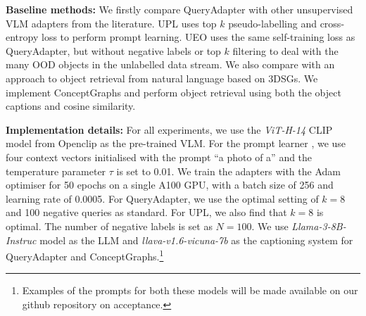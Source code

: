 

\textbf{Baseline methods: }We firstly compare QueryAdapter with other unsupervised VLM adapters from the literature. UPL \cite{upl} uses top $k$ pseudo-labelling and cross-entropy loss to perform prompt learning. UEO \cite{ueo} uses the same self-training loss as QueryAdapter, but without negative labels or top $k$ filtering to deal with the many OOD objects in the unlabelled data stream. We also compare with an approach to object retrieval from natural language based on 3DSGs. We implement ConceptGraphs \cite{conceptgraphs} and perform object retrieval using both the object captions and cosine similarity.

\textbf{Implementation details: }For all experiments, we use the \textit{ViT-H-14} CLIP model from Openclip \cite{clip} as the pre-trained VLM. For the prompt learner \cite{coop}, we use four context vectors initialised with the prompt ``a photo of a'' and the temperature parameter $\tau$ is set to 0.01. We train the adapters with the Adam optimiser for 50 epochs on a single A100 GPU, with a batch size of 256 and learning rate of 0.0005. For QueryAdapter, we use the optimal setting of $k=8$ and 100 negative queries as standard. For UPL, we also find that $k=8$ is optimal. The number of negative labels is set as $N=100$. We use \textit{Llama-3-8B-Instruc} model as the LLM and \textit{llava-v1.6-vicuna-7b} as the captioning system for QueryAdapter and ConceptGraphs.\footnote{Examples of the prompts for both these models will be made available on our github repository on acceptance.\label{myfootnote}}

